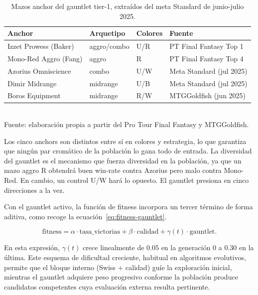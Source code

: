 \begin{table}[H]
\centering
\caption{Mazos anchor del gauntlet tier-1, extraídos del meta Standard de junio-julio 2025.}
\label{tab:gauntlet-anchors}
\begin{tabular}{llll}
\toprule
\textbf{Anchor} & \textbf{Arquetipo} & \textbf{Colores} & \textbf{Fuente} \\
\midrule
Izzet Prowess (Baker)   & aggro/combo & U/R & PT Final Fantasy Top 1 \\
Mono-Red Aggro (Fang)   & aggro       & R   & PT Final Fantasy Top 4 \\
Azorius Omniscience     & combo       & U/W & Meta Standard (jul 2025) \\
Dimir Midrange          & midrange    & U/B & Meta Standard (jul 2025) \\
Boros Equipment         & midrange    & R/W & MTGGoldfish (jun 2025) \\
\bottomrule
\end{tabular}
\\[2pt]{\footnotesize Fuente: elaboración propia a partir del Pro Tour Final Fantasy y MTGGoldfish.}
\end{table}

Los cinco anchors son distintos entre sí en colores y estrategia, lo que garantiza que ningún par cromático de la población lo gana todo de entrada. La diversidad del gauntlet es el mecanismo que fuerza diversidad en la población, ya que un mazo aggro R obtendrá buen win-rate contra Azorius pero malo contra Mono-Red. En cambio, un control U/W hará lo opuesto. El gauntlet presiona en cinco direcciones a la vez.

Con el gauntlet activo, la función de fitness incorpora un tercer término de forma aditiva, como recoge la ecuación~\ref{eq:fitness-gauntlet}.

\begin{equation}
\text{fitness} = \alpha \cdot \text{tasa\_victorias} + \beta \cdot \text{calidad} + \gamma(t) \cdot \text{gauntlet}.
\label{eq:fitness-gauntlet}
\end{equation}

En esta expresión, $\gamma(t)$ crece linealmente de 0.05 en la generación 0 a 0.30 en la última. Este esquema de dificultad creciente, habitual en algoritmos evolutivos, permite que el bloque interno (Swiss + calidad) guíe la exploración inicial, mientras el gauntlet adquiere peso progresivo conforme la población produce candidatos competentes cuya evaluación externa resulta pertinente.

